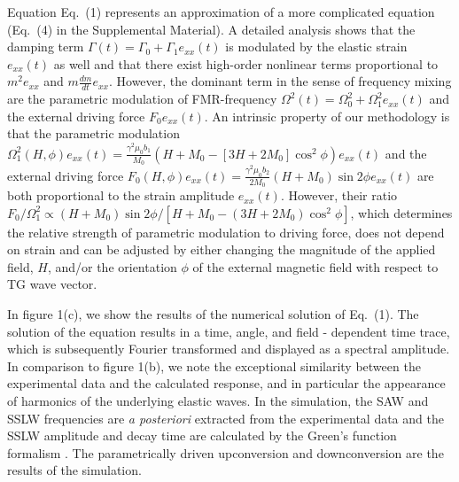 \documentclass[aps,showpacs,prb,twocolumn,superscriptaddress]{revtex4}
\begin{document}
 
Equation Eq.~(1) represents an approximation of a more complicated equation (Eq.~(4) in the Supplemental Material). A detailed analysis shows that the damping term $\Gamma(t)=\Gamma_0+\Gamma_1e_{xx}(t)$ is modulated by the elastic strain $e_{xx}(t)$ as well and that there exist high-order nonlinear terms proportional to $m^2e_{xx}$ and $m\frac{dm}{dt}e_{xx}$. However, the dominant term in the sense of frequency mixing are the parametric modulation of FMR-frequency $\Omega^2(t)=\Omega_0^2+\Omega_1^2e_{xx}(t)$ and the external driving force $F_0e_{xx}(t)$. An intrinsic property of our methodology is that the parametric modulation $\Omega^2_1(H,\phi)e_{xx}(t)=\frac{\gamma^2\mu_0b_1}{M_0}(H+M_0-[3H+2M_0]\cos^2\phi)e_{xx}(t)$ and the external driving force $F_0(H,\phi)e_{xx}(t)=\frac{\gamma^2\mu_0b_2}{2M_0}(H+M_0)\sin 2\phi e_{xx}(t)$ are both proportional to the strain amplitude $e_{xx}(t)$.
However, their ratio $F_0/\Omega^2_1\propto (H+M_0)\sin 2\phi/[H+M_0-(3H+2M_0)\cos^2\phi]$, which determines the relative strength of parametric modulation to driving force,  does not depend on strain and can be adjusted by either changing the magnitude of the applied field, $H$, and/or the orientation $\phi$ of the external magnetic field with respect to TG wave vector. 

In figure 1(c), we show the results of the numerical solution of Eq.~(1). The solution of the equation results in a time, angle, and field - dependent time trace, which is subsequently Fourier transformed and displayed as a spectral amplitude. In comparison to figure 1(b), we note the exceptional similarity between the experimental data and the calculated response, and in particular the appearance of harmonics of the underlying elastic waves.  In the simulation, the SAW and SSLW frequencies are {\it a posteriori} extracted from the experimental data and the SSLW amplitude and decay time are calculated by the Green's function formalism \cite{Janusonis2016_1}. The parametrically driven upconversion and downconversion are the results of the simulation. 
\end{document}
